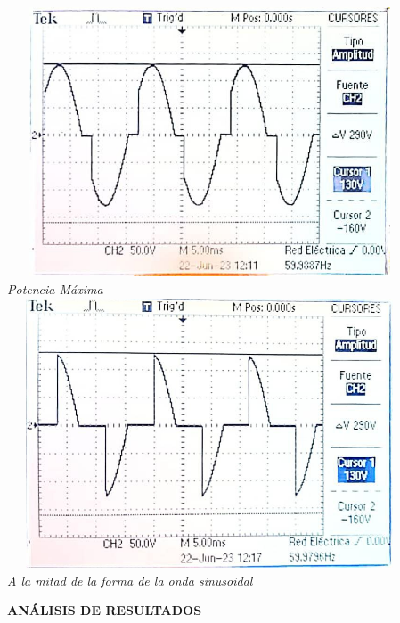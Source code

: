 \documentclass[12pt]{article}
\begin{document}
	\begin{center}
		\includegraphics[width=12cm,height=8cm]{Img/resul_24_1}\\
		\textit{Potencia Máxima}\\
		\vspace{2cm}
		\includegraphics[width=12cm,height=8cm]{Img/resul_24_2}\\
		\textit{A la mitad de la forma de la onda sinusoidal}\\
	\end{center}
	
	\newpage
	
	\begin{center}
		\textbf{\large ANÁLISIS DE RESULTADOS}\\
	\end{center}
	
	\renewcommand{\theenumi}{\alph{enumi}} %
	
\end{document}

